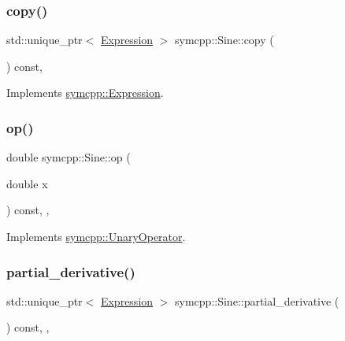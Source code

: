 \subsubsection{\texorpdfstring{copy()}{copy()}}
{\footnotesize\ttfamily std\+::unique\+\_\+ptr$<$ \mbox{\hyperlink{classsymcpp_1_1Expression}{Expression}} $>$ symcpp\+::\+Sine\+::copy (\begin{DoxyParamCaption}{ }\end{DoxyParamCaption}) const\hspace{0.3cm}{\ttfamily [override]}, {\ttfamily [virtual]}}



Implements \mbox{\hyperlink{classsymcpp_1_1Expression_a2e7de5a295ccf0efdc9b34cea7ba3d0b}{symcpp\+::\+Expression}}.

\mbox{\label{classsymcpp_1_1Sine_afb302fcff7d0a5e528f8fe5a2d111666}} 
\subsubsection{\texorpdfstring{op()}{op()}}
{\footnotesize\ttfamily double symcpp\+::\+Sine\+::op (\begin{DoxyParamCaption}\item[{double}]{x }\end{DoxyParamCaption}) const\hspace{0.3cm}{\ttfamily [override]}, {\ttfamily [private]}, {\ttfamily [virtual]}}



Implements \mbox{\hyperlink{classsymcpp_1_1UnaryOperator_a679c3c46cad3a62bdd776ff836c7891e}{symcpp\+::\+Unary\+Operator}}.

\mbox{\label{classsymcpp_1_1Sine_ac7978c7094ce614049521c4d9cfd0827}} 
\subsubsection{\texorpdfstring{partial\_derivative()}{partial\_derivative()}}
{\footnotesize\ttfamily std\+::unique\+\_\+ptr$<$ \mbox{\hyperlink{classsymcpp_1_1Expression}{Expression}} $>$ symcpp\+::\+Sine\+::partial\+\_\+derivative (\begin{DoxyParamCaption}{ }\end{DoxyParamCaption}) const\hspace{0.3cm}{\ttfamily [override]}, {\ttfamily [private]}, {\ttfamily [virtual]}}




